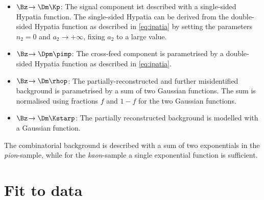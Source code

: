 \begin{itemize}
	\item $\Bz\!\to\Dm\Kp$: The signal component ist described with a single-sided Hypatia function. The single-sided Hypatia can be derived from the double-sided Hypatia function as described in \cref{eq:ipatia} by setting the parameters $n_2=0$ and $a_2\to+\infty$, \ie fixing $a_2$ to a large value.
	\item $\Bz\!\to\Dpm\pimp$: The cross-feed component is parametrised by a double-sided Hypatia function as described in \cref{eq:ipatia}.
	\item $\Bz\!\to\Dm\rhop$: The partially-reconstructed and further misidentified background is parametrised by a sum of two Gaussian functions. The sum is normalised using fractions $f$ and $1-f$ for the two Gaussian functions.
	\item $\Bz\!\to\Dm\Kstarp$: The partially reconstructed background is modelled with a Gaussian function.
\end{itemize}
The combinatorial background is described with a sum of two exponentials in the \emph{pion}-sample, while for the \emph{kaon}-sample a single exponential function is sufficient.

\section{Fit to data}
\label{sec:MassFitData}

